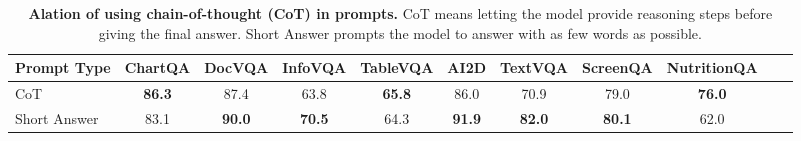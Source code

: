\begin{table*}[!ht]
    \small
    \centering
    \begin{tabular}{lcccccccccc}
        \toprule
        \textbf{Prompt Type} & \textbf{ChartQA} & \textbf{DocVQA} & \textbf{InfoVQA} & \textbf{TableVQA} & \textbf{AI2D} & \textbf{TextVQA} & \textbf{ScreenQA} & \textbf{NutritionQA}\\
        \midrule
        CoT & \textbf{86.3} & 87.4 & 63.8 & \textbf{65.8} & 86.0 & 70.9 & 79.0 & \textbf{76.0}\\
        Short Answer & 83.1 & \textbf{90.0} & \textbf{70.5} & 64.3 & \textbf{91.9} & \textbf{82.0} & \textbf{80.1} & 62.0\\
        \bottomrule
    \end{tabular}
    \vspace{-.1cm}
    \caption{\textbf{Alation of using chain-of-thought (CoT) in prompts.} CoT means letting the model provide reasoning steps before giving the final answer. Short Answer prompts the model to answer with as few words as possible.}
    \label{tab:cot}
\end{table*}
